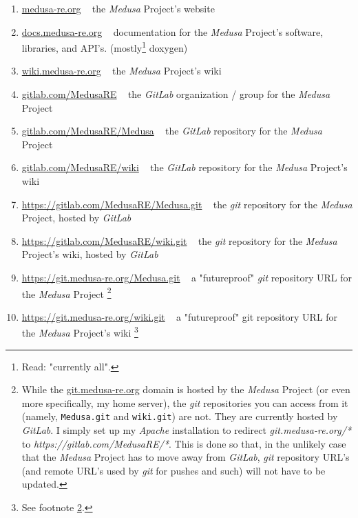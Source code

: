 \documentclass{report}
\newcommand{\Medusa}{\textit{Medusa}\xspace}
\begin{document}
	\begin{enumerate}
		\item \href{https://www.medusa-re.org}{medusa-re.org} ~ the \Medusa
		Project's website

		\item \href{https://docs.medusa-re.org}{docs.medusa-re.org} ~
		documentation for the \Medusa Project's software, libraries, and API's.
		(mostly\footnote{Read: "currently all".} doxygen)

		\item \href{https://wiki.medusa-re.org}{wiki.medusa-re.org} ~ the
		\Medusa Project's wiki

		\item \href{https://www.gitlab.com/MedusaRE}{gitlab.com/MedusaRE}
		~ the \textit{GitLab} organization / group for the \Medusa Project

		\item \href{https://www.gitlab.com/MedusaRE/Medusa}
				   {gitlab.com/MedusaRE/Medusa}
		~ the \textit{GitLab} repository for the \Medusa Project

		\item \href{https://www.gitlab.com/MedusaRE/wiki}
				   {gitlab.com/MedusaRE/wiki}
		~ the \textit{GitLab} repository for the \Medusa Project's wiki

		\item \href{https://www.gitlab.com/MedusaRE/Medusa.git}
				   {https://gitlab.com/MedusaRE/Medusa.git}
		~ the \textit{git} repository for the \Medusa Project, hosted by
		\textit{GitLab}

		\item \href{https://www.gitlab.com/MedusaRE/wiki.git}
				   {https://gitlab.com/MedusaRE/wiki.git}
		~ the \textit{git} repository for the \Medusa Project's wiki, hosted by
		\textit{GitLab}

		\item \href{https://git.medusa-re.org/Medusa.git}
				   {https://git.medusa-re.org/Medusa.git}
		~ a "futureproof" \textit{git} repository URL for the \Medusa Project
		\footnote{
			\label{git_note}
			While the \href{https://git.medusa-re.org}{git.medusa-re.org} domain
			is hosted by the \Medusa Project (or even more specifically, my
			home server), the \textit{git} repositories you can access from it
			(namely, \texttt{Medusa.git} and \texttt{wiki.git}) are not. They
			are currently hosted by \textit{GitLab}. I simply set up my
			\textit{Apache} installation to redirect
			\textit{git.medusa-re.org/*} to
			\textit{https://gitlab.com/MedusaRE/*}. This is done so that, in the
			unlikely case that the \Medusa Project has to move away from
			\textit{GitLab}, \textit{git} repository URL's (and remote URL's
			used by \textit{git} for pushes and such) will not have to be
			updated.
		}

		\item \href{https://www.gitlab.com/MedusaRE/wiki.git}
				   {https://git.medusa-re.org/wiki.git}
		~ a "futureproof" git repository URL for the \Medusa Project's wiki
		\footnote{See footnote \ref{git_note}.}
	\end{enumerate}
\end{document}
